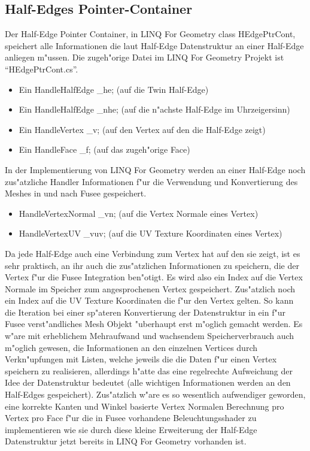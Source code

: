 \documentclass[pagesize, paper=a4, fontsize=12pt,titlepage=true, headings=small, headnosepline, abstractoff, liststotoc, nochapterprefix, plainheadsepline]{scrreprt}
\newcommand{\LFGS}{LINQ For Geometry }
\newcommand{\HES}{Half-Edge Datenstruktur }
\begin{document}
\subsection {Half-Edges Pointer-Container}
			Der Half-Edge Pointer Container, in \LFGS class HEdgePtrCont, speichert alle Informationen die laut \HES an einer Half-Edge anliegen m"ussen. Die zugeh"orige Datei im \LFGS Projekt ist "`HEdgePtrCont.cs"'.
\begin{itemize}
\item Ein HandleHalfEdge \_he; (auf die Twin Half-Edge)
\item Ein HandleHalfEdge \_nhe; (auf die n"achste Half-Edge im Uhrzeigersinn)
\item Ein HandleVertex \_v; (auf den Vertex auf den die Half-Edge zeigt)
\item Ein HandleFace \_f; (auf das zugeh"orige Face)
\end{itemize}

In der Implementierung von \LFGS werden an einer Half-Edge noch zus"atzliche Handler Informationen f"ur die Verwendung und Konvertierung des Meshes in und nach Fusee gespeichert.

\begin{itemize}
\item HandleVertexNormal \_vn; (auf die Vertex Normale eines Vertex)
\item HandleVertexUV \_vuv; (auf die UV Texture Koordinaten eines Vertex)
\end{itemize}

Da jede Half-Edge auch eine Verbindung zum Vertex hat auf den sie zeigt, ist es sehr praktisch, an ihr auch die zus"atzlichen Informationen zu speichern, die der Vertex f"ur die Fusee Integration  ben"otigt. Es wird also ein Index auf die Vertex Normale im Speicher zum angesprochenen Vertex gespeichert. Zus"atzlich noch ein Index auf die UV Texture Koordinaten die f"ur den Vertex gelten. So kann die Iteration bei einer sp"ateren Konvertierung der Datenstruktur in ein f"ur Fusee verst"andliches Mesh Objekt "uberhaupt erst m"oglich gemacht werden. Es w"are mit erheblichem Mehraufwand und wachsendem Speicherverbrauch auch m"oglich gewesen, die Informationen an den einzelnen Vertices durch Verkn"upfungen mit Listen, welche jeweils die die Daten f"ur einen Vertex speichern zu realisieren, allerdings h"atte das eine regelrechte Aufweichung der Idee der Datenstruktur bedeutet (alle wichtigen Informationen werden an den Half-Edges gespeichert). Zus"atzlich w"are es so wesentlich aufwendiger geworden, eine korrekte Kanten und Winkel basierte Vertex Normalen Berechnung pro Vertex pro Face f"ur die in Fusee vorhandene Beleuchtungsshader zu implementieren wie sie durch diese kleine Erweiterung der \HES jetzt bereits in \LFGS vorhanden ist.
\end{document}
